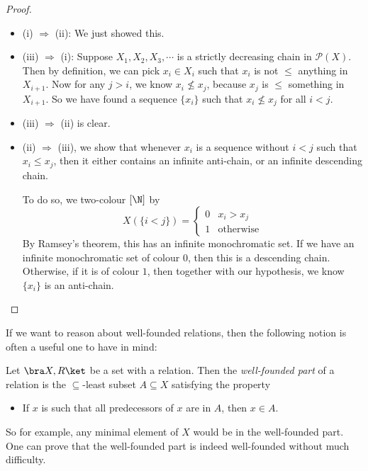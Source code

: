 \documentclass[a4paper]{article}
\begin{document}
\begin{proof}\leavevmode
  \begin{itemize}
    \item (i) $\Rightarrow$ (ii): We just showed this.
    \item (iii) $\Rightarrow$ (i): Suppose $X_1, X_2, X_3, \cdots$ is a strictly decreasing chain in $\mathcal{P}(X)$. Then by definition, we can pick $x_i \in X_i$ such that $x_i$ is not $\leq$ anything in $X_{i + 1}$. Now for any $j > i$, we know $x_i \not \leq x_j$, because $x_j$ is $\leq$ something in $X_{i + 1}$. So we have found a sequence $\{x_i\}$ such that $x_i \not \leq x_j$ for all $i < j$.

    \item (iii) $\Rightarrow$ (ii) is clear.

    \item (ii) $\Rightarrow$ (iii), we show that whenever $x_i$ is a sequence without $i < j$ such that $x_i \leq x_j$, then it either contains an infinite anti-chain, or an infinite descending chain.

      To do so, we two-colour $[\N]$ by
      \[
        X(\{i < j\}) =
        \begin{cases}
          0 & x_i > x_j\\
          1 & \text{otherwise}
        \end{cases}
      \]
      By Ramsey's theorem, this has an infinite monochromatic set. If we have an infinite monochromatic set of colour $0$, then this is a descending chain. Otherwise, if it is of colour $1$, then together with our hypothesis, we know $\{x_i\}$ is an anti-chain.\qedhere
  \end{itemize}
\end{proof}

If we want to reason about well-founded relations, then the following notion is often a useful one to have in mind:
\begin{defi}
  Let $\bra X, R\ket$ be a set with a relation. Then the \emph{well-founded part} of a relation is the $\subseteq$-least subset $A \subseteq X$ satisfying the property
  \begin{itemize}
    \item If $x$ is such that all predecessors of $x$ are in $A$, then $x \in A$.
  \end{itemize}
\end{defi}
So for example, any minimal element of $X$ would be in the well-founded part. One can prove that the well-founded part is indeed well-founded without much difficulty.
\end{document}
